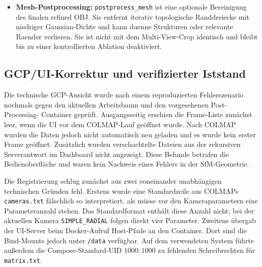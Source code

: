 \documentclass[12pt,a4paper]{article}
\begin{document}
\begin{itemize}
          die GCPs in registrierten COLMAP-Bildern ueber die UI, trianguliert
          deren SfM-Positionen und berechnet die relative SfM-zu-UTM-
          Aehnlichkeitstransformation. Der erste GCP ist standardmaessig der
          Anchor; eine explizite Auswahl in der UI ist ein noch offener
          Verbesserungsbaustein. Die aktuelle GCP-Testdatei ist ein
          synthetisches lokales Raster und daher kein echter UTM-
          Genauigkeitsnachweis. Der Fallback bleibt fuer Laeufe ohne Matrix
          oder Anchor erhalten.
          \item \textbf{Mesh-Postprocessing:} \texttt{postprocess\_mesh} ist eine
          optionale Bereinigung des finalen refined OBJ. Sie entfernt
          iterativ topologische Randdreiecke mit niedriger Gaussian-Dichte und
          kann duenne Strukturen oder relevante Raender verlieren. Sie ist
          nicht mit dem Multi-View-Crop identisch und bleibt bis zu einer
          kontrollierten Ablation deaktiviert.
\end{itemize}

\subsection*{GCP/UI-Korrektur und verifizierter Iststand}
Die technische GCP-Ansicht wurde nach einem reproduzierten Fehlerszenario
nochmals gegen den aktuellen Arbeitsbaum und den vorgesehenen Post-Processing-
Container geprüft. Ausgangsseitig erschien die Frame-Liste zunächst leer,
wenn die UI vor dem COLMAP-Lauf geöffnet wurde. Nach COLMAP wurden die Daten
jedoch nicht automatisch neu geladen und es wurde kein erster Frame geöffnet.
Zusätzlich wurden verschachtelte Dateien aus der rekursiven Serverantwort im
Dashboard nicht angezeigt. Diese Befunde betrafen die Bedienoberfläche und
waren kein Nachweis eines Fehlers in der SfM-Geometrie.

Die Registrierung schlug zunächst aus zwei voneinander unabhängigen
technischen Gründen fehl. Erstens wurde eine Standardzeile aus COLMAPs
\texttt{cameras.txt} fälschlich so interpretiert, als müsse vor den
Kameraparametern eine Parameteranzahl stehen. Das Standardformat enthält diese
Anzahl nicht; bei der aktuellen Kamera
\texttt{SIMPLE\_RADIAL} folgen direkt vier Parameter. Zweitens übergab der
UI-Server beim Docker-Aufruf Host-Pfade an den Container. Dort sind die
Bind-Mounts jedoch unter \texttt{/data} verfügbar. Auf dem verwendeten System
führte außerdem die Compose-Standard-UID $1000:1000$ zu fehlenden
Schreibrechten für \texttt{matrix.txt}.
\end{document}
